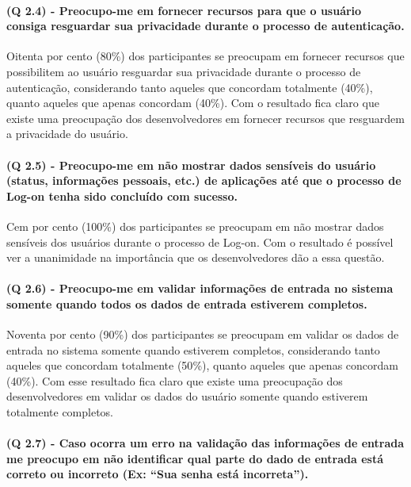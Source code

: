 \paragraph{\textbf{(Q 2.4)} - Preocupo-me em fornecer recursos para que o usuário consiga resguardar sua privacidade durante o processo de autenticação.}

Oitenta por cento (80{\%}) dos participantes se preocupam em fornecer recursos que possibilitem ao usuário resguardar sua privacidade durante o processo de autenticação, considerando tanto aqueles que concordam totalmente (40{\%}), quanto aqueles que apenas concordam (40{\%}). Com o resultado fica claro que existe uma preocupação dos desenvolvedores em fornecer recursos que resguardem a privacidade do usuário.

\paragraph{\textbf{(Q 2.5)} - Preocupo-me em não mostrar dados sensíveis do usuário (status, informações pessoais, etc.) de aplicações até que o processo de Log-on tenha sido concluído com sucesso.}

Cem por cento (100{\%}) dos participantes se preocupam em não mostrar dados sensíveis dos usuários durante o processo de Log-on. Com o resultado é possível ver a unanimidade na importância que os desenvolvedores dão a essa questão.

\paragraph{\textbf{(Q 2.6)} - Preocupo-me em validar informações de entrada no sistema somente quando todos os dados de entrada estiverem completos.}

Noventa por cento (90{\%}) dos participantes se preocupam em validar os dados de entrada no sistema somente quando estiverem completos, considerando tanto aqueles que concordam totalmente (50{\%}), quanto aqueles que apenas concordam (40{\%}). Com esse resultado fica claro que existe uma preocupação dos desenvolvedores em validar os dados do usuário somente quando estiverem totalmente completos.

\paragraph{\textbf{(Q 2.7)} - Caso ocorra um erro na validação das informações de entrada me preocupo em não identificar qual parte do dado de entrada está correto ou incorreto (Ex: “Sua senha está incorreta”).}

